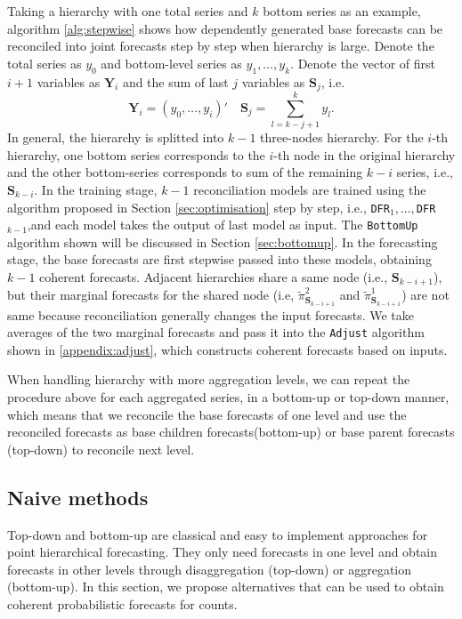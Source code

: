 \documentclass[a4paper,review,12pt,authoryear]{elsarticle}
\let\code=\texttt
\newcommand{\bY}{\mathbf{Y}}
\begin{document}
  Taking a hierarchy with one total series and $k$ bottom series as an example, algorithm \ref{alg:stepwise} shows how dependently generated base forecasts can be reconciled into joint forecasts step by step when hierarchy is large. 
  Denote the total series as $y_0$ and bottom-level series as $y_1, \dots, y_k$. 
  Denote the vector of first $i+1$ variables as $\mathbf{Y}_i$ and the sum of last $j$ variables as $\mathbf{S}_j$, i.e.
  \[
   \bY_i = (y_0, \dots, y_i)' \quad \mathbf{S}_j = \sum_{l=k-j+1}^{k} y_l.
  \] 
  In general, the hierarchy is splitted into $k-1$ three-nodes hierarchy.  
  For the $i$-th hierarchy, one bottom series corresponds to the $i$-th node in the original hierarchy and the other bottom-series corresponds to sum of the remaining $k-i$ series, i.e., $\mathbf{S}_{k-i}$.
  In the training stage, $k-1$ reconciliation models are trained using the algorithm proposed in Section \ref{sec:optimisation} step by step, i.e., \code{DFR}$_1,\dots,$\code{DFR}$_{k-1}$,and each model takes the output of last model as input.
  The \code{BottomUp} algorithm shown will be discussed in Section \ref{sec:bottomup}.
  In the forecasting stage, the base forecasts are first stepwise passed into these models, obtaining $k-1$ coherent forecasts.
  Adjacent hierarchies share a same node (i.e., $\mathbf{S}_{k-i+1}$), but their marginal forecasts for the shared node (i.e, $\tilde\pi^{2}_{\mathbf{S}_{k-i+1}}$ and $\tilde\pi^{1}_{\mathbf{S}_{k-i+1}}$) are not same because reconciliation generally changes the input forecasts.
  We take averages of the two marginal forecasts and pass it into the \code{Adjust} algorithm shown in \ref{appendix:adjust}, which constructs coherent forecasts based on inputs.

   When handling hierarchy with more aggregation levels, we can repeat the procedure above for each aggregated series, in a bottom-up or top-down manner, which means that we reconcile the base forecasts of one level and use the reconciled forecasts as base children forecasts(bottom-up) or base parent forecasts (top-down) to reconcile next level.

   \subsection{Naive methods}

   Top-down and bottom-up are classical and easy to implement approaches for point hierarchical forecasting. 
   They only need forecasts in one level and obtain forecasts in other levels through disaggregation (top-down) or aggregation (bottom-up).
   In this section, we propose alternatives that can be used to obtain coherent probabilistic forecasts for counts.
\end{document}

